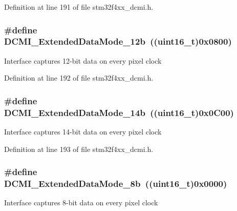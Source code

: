 Definition at line 191 of file stm32f4xx\-\_\-dcmi.\-h.

\hypertarget{group___d_c_m_i___extended___data___mode_ga183733b7d784387200aa00b988c906da}{
\subsubsection[{D\-C\-M\-I\-\_\-\-Extended\-Data\-Mode\-\_\-12b}]{\setlength{\rightskip}{0pt plus 5cm}\#define D\-C\-M\-I\-\_\-\-Extended\-Data\-Mode\-\_\-12b~((uint16\-\_\-t)0x0800)}}\label{group___d_c_m_i___extended___data___mode_ga183733b7d784387200aa00b988c906da}
Interface captures 12-\/bit data on every pixel clock 

Definition at line 192 of file stm32f4xx\-\_\-dcmi.\-h.

\hypertarget{group___d_c_m_i___extended___data___mode_gae1a4ca9b9a1929a40213758e80d38e15}{
\subsubsection[{D\-C\-M\-I\-\_\-\-Extended\-Data\-Mode\-\_\-14b}]{\setlength{\rightskip}{0pt plus 5cm}\#define D\-C\-M\-I\-\_\-\-Extended\-Data\-Mode\-\_\-14b~((uint16\-\_\-t)0x0\-C00)}}\label{group___d_c_m_i___extended___data___mode_gae1a4ca9b9a1929a40213758e80d38e15}
Interface captures 14-\/bit data on every pixel clock 

Definition at line 193 of file stm32f4xx\-\_\-dcmi.\-h.

\hypertarget{group___d_c_m_i___extended___data___mode_ga01627fb1fcd0d0682628e5bea8e5dfba}{
\subsubsection[{D\-C\-M\-I\-\_\-\-Extended\-Data\-Mode\-\_\-8b}]{\setlength{\rightskip}{0pt plus 5cm}\#define D\-C\-M\-I\-\_\-\-Extended\-Data\-Mode\-\_\-8b~((uint16\-\_\-t)0x0000)}}\label{group___d_c_m_i___extended___data___mode_ga01627fb1fcd0d0682628e5bea8e5dfba}
Interface captures 8-\/bit data on every pixel clock 


